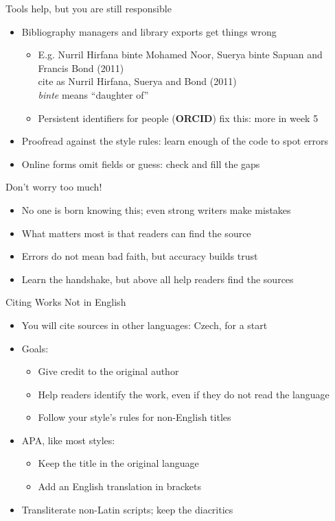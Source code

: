\documentclass[aspectratio=169]{beamer}
\begin{document}
\begin{frame}{Tools help, but you are still responsible}
\begin{itemize}
\item Bibliography managers and library exports get things wrong
  \begin{itemize}
  \item E.g. Nurril Hirfana binte Mohamed Noor, Suerya binte Sapuan and Francis Bond (2011)
    \\ cite as Nurril Hirfana, Suerya and Bond (2011)
    \\ \textit{binte} means ``daughter of''
  \item Persistent identifiers for people (\textbf{ORCID}) fix this: more in week 5
  \end{itemize}
  \item Proofread against the style rules: learn enough of the code to spot errors
  \item Online forms omit fields or guess: check and fill the gaps
\end{itemize}
\end{frame}

\begin{frame}{Don't worry too much!}
\begin{itemize}
  \item No one is born knowing this; even strong writers make mistakes
  \item What matters most is that readers can find the source
  \item Errors do not mean bad faith, but accuracy builds trust
  \item Learn the handshake, but above all help readers find the sources
\end{itemize}
\end{frame}


\begin{frame}{Citing Works Not in English}
\begin{itemize}
  \item You will cite sources in other languages: Czech, for a start
  \item Goals:
    \begin{itemize}
      \item Give credit to the original author
      \item Help readers identify the work, even if they do not read the language
      \item Follow your style's rules for non-English titles
    \end{itemize}
  \item APA, like most styles:
    \begin{itemize}
      \item Keep the title in the original language
      \item Add an English translation in brackets
    \end{itemize}
  \item Transliterate non-Latin scripts; keep the diacritics
\end{itemize}
\end{frame}
\end{document}
